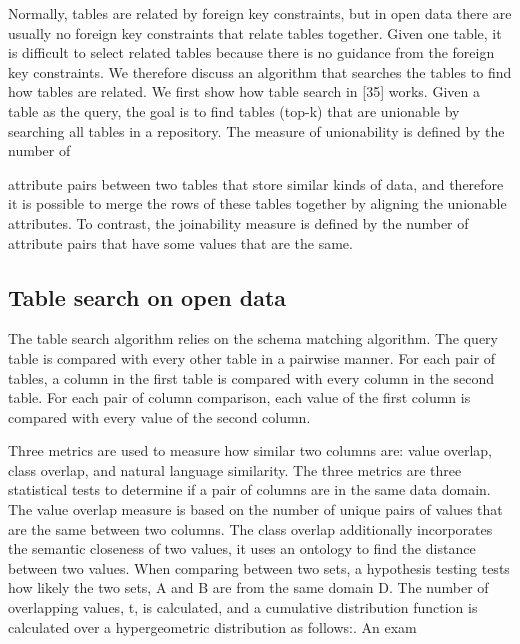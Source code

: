 Normally, tables are related by foreign key constraints, but in open data there are usually no foreign key constraints that relate tables together. Given one table, it is difficult to select related tables because there is no guidance from the foreign key constraints. We therefore discuss an algorithm that searches the tables to find how tables are related. We first show how table search in \cite{Nargesian2018Table}[35] works. Given a table as the query, the goal is to find tables (top-k) that are unionable by searching all tables in a repository. The measure of unionability is defined by the number of

attribute pairs between two tables that store similar kinds of data, and therefore it is possible to merge the rows of these tables together by aligning the unionable attributes. To contrast, the joinability measure is defined by the number of attribute pairs that have some values that are the same.

\subsection{Table search on open data}
\label{ssec:TableSearchOnOpenData}

The table search algorithm relies on the schema matching algorithm. The query table is compared with every other table in a pairwise manner. For each pair of tables, a column in the first table is compared with every column in the second table. For each pair of column comparison, each value of the first column is compared with every value of the second column.

Three metrics are used to measure how similar two columns are: value overlap, class overlap, and natural language similarity. The three metrics are three statistical tests to determine if a pair of columns are in the same data domain. The value overlap measure is based on the number of unique pairs of values that are the same between two columns. The class overlap additionally incorporates the semantic closeness of two values, it uses an ontology to find the distance between two values. When comparing between two sets, a hypothesis testing tests how likely the two sets, A and B are from the same domain D. The number of overlapping values, t, is calculated, and a cumulative distribution function is calculated over a hypergeometric distribution as follows:. An exam


